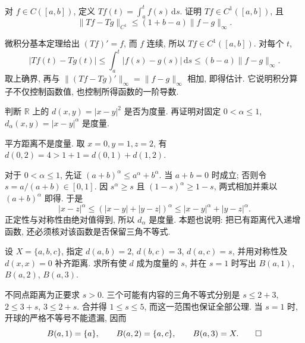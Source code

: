 \begin{exercise}\label{ch:metric:ex-integration}
对 $f\in C([a,b])$, 定义 $Tf(t)=\int_a^tf(s)\,\mathrm{d}s$. 证明 $Tf\in C^1([a,b])$, 且
\[
 \lVert Tf-Tg\rVert_{C^1}\le(1+b-a)\lVert f-g\rVert_\infty.
\]
\end{exercise}
\begin{solution}
微积分基本定理给出 $(Tf)'=f$, 而 $f$ 连续, 所以 $Tf\in C^1([a,b])$. 对每个 $t$,
\[
 |Tf(t)-Tg(t)|
 \le\int_a^t|f(s)-g(s)|\,\mathrm{d}s
 \le(b-a)\lVert f-g\rVert_\infty.
\]
取上确界, 再与 $\lVert(Tf-Tg)'\rVert_\infty=\lVert f-g\rVert_\infty$ 相加, 即得估计. 它说明积分算子不仅控制函数值, 也控制所得函数的一阶导数.
\end{solution}

\begin{exercise}\label{ch:metric:ex-nonmetric}
判断 $\mathbb{R}$ 上的 $d(x,y)=|x-y|^2$ 是否为度量. 再证明对固定 $0<\alpha\le1$, $d_\alpha(x,y)=|x-y|^\alpha$ 是度量.
\end{exercise}
\begin{solution}
平方距离不是度量. 取 $x=0,y=1,z=2$, 有 $d(0,2)=4>1+1=d(0,1)+d(1,2)$.

对于 $0<\alpha\le1$, 先证 $(a+b)^\alpha\le a^\alpha+b^\alpha$. 当 $a+b=0$ 时成立; 否则令 $s=a/(a+b)\in[0,1]$. 因 $s^\alpha\ge s$ 且 $(1-s)^\alpha\ge1-s$, 两式相加并乘以 $(a+b)^\alpha$ 即得. 于是
\[
 |x-z|^\alpha\le(|x-y|+|y-z|)^\alpha
 \le|x-y|^\alpha+|y-z|^\alpha.
\]
正定性与对称性由绝对值得到, 所以 $d_\alpha$ 是度量. 本题也说明: 把已有距离代入递增函数, 还必须核对该函数是否保留三角不等式.
\end{solution}

\begin{exercise}\label{ch:metric:ex-finite}
设 $X=\{a,b,c\}$, 指定 $d(a,b)=2$, $d(b,c)=3$, $d(a,c)=s$, 并用对称性及 $d(x,x)=0$ 补齐距离. 求所有使 $d$ 成为度量的 $s$, 并在 $s=1$ 时写出 $B(a,1)$, $B(a,2)$, $B(a,3)$.
\end{exercise}
\begin{solution}
不同点距离为正要求 $s>0$. 三个可能有内容的三角不等式分别是 $s\le2+3$, $2\le3+s$, $3\le2+s$. 合并得 $1\le s\le5$, 而这一范围也保证全部公理. 当 $s=1$ 时, 开球的严格不等号不能遗漏, 因而
\[
 B(a,1)=\{a\},\qquad B(a,2)=\{a,c\},\qquad B(a,3)=X.\qedhere
\]
\end{solution}
